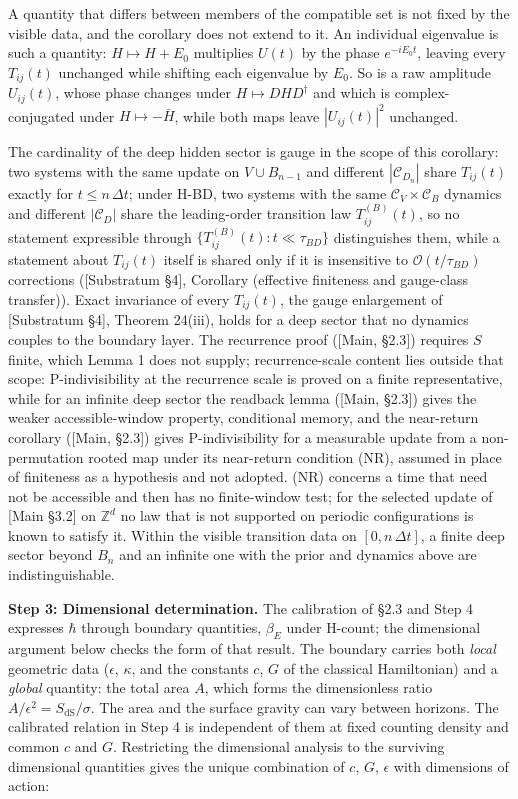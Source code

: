 \documentclass[
]{article}
\begin{document}
A quantity that differs between members of the compatible set is not
fixed by the visible data, and the corollary does not extend to it. An
individual eigenvalue is such a quantity: \(H \mapsto H + E_0\)
multiplies \(U(t)\) by the phase \(e^{-iE_0 t}\), leaving every
\(T_{ij}(t)\) unchanged while shifting each eigenvalue by \(E_0\). So is
a raw amplitude \(U_{ij}(t)\), whose phase changes under
\(H \mapsto DHD^\dagger\) and which is complex-conjugated under
\(H \mapsto -\bar{H}\), while both maps leave \(|U_{ij}(t)|^2\)
unchanged.

The cardinality of the deep hidden sector is gauge in the scope of this
corollary: two systems with the same update on \(V \cup B_{n-1}\) and
different \(|\mathcal{C}_{D_n}|\) share \(T_{ij}(t)\) exactly for
\(t \leq n\,\Delta t\); under H-BD, two systems with the same
\(\mathcal{C}_V \times \mathcal{C}_B\) dynamics and different
\(|\mathcal{C}_D|\) share the leading-order transition law
\(T^{(B)}_{ij}(t)\), so no statement expressible through
\(\{T^{(B)}_{ij}(t) : t \ll \tau_{BD}\}\) distinguishes them, while a
statement about \(T_{ij}(t)\) itself is shared only if it is insensitive
to \(\mathcal{O}(t/\tau_{BD})\) corrections ({[}Substratum §4{]},
Corollary (effective finiteness and gauge-class transfer)). Exact
invariance of every \(T_{ij}(t)\), the gauge enlargement of
{[}Substratum §4{]}, Theorem 24(iii), holds for a deep sector that no
dynamics couples to the boundary layer. The recurrence proof ({[}Main,
§2.3{]}) requires \(S\) finite, which Lemma 1 does not supply;
recurrence-scale content lies outside that scope: P-indivisibility at
the recurrence scale is proved on a finite representative, while for an
infinite deep sector the readback lemma ({[}Main, §2.3{]}) gives the
weaker accessible-window property, conditional memory, and the
near-return corollary ({[}Main, §2.3{]}) gives P-indivisibility for a
measurable update from a non-permutation rooted map under its
near-return condition (NR), assumed in place of finiteness as a
hypothesis and not adopted. (NR) concerns a time that need not be
accessible and then has no finite-window test; for the selected update
of {[}Main §3.2{]} on \(\mathbb{Z}^d\) no law that is not supported on
periodic configurations is known to satisfy it. Within the visible
transition data on \([0, n\,\Delta t]\), a finite deep sector beyond
\(B_n\) and an infinite one with the prior and dynamics above are
indistinguishable.

\textbf{Step 3: Dimensional determination.} The calibration of §2.3 and
Step 4 expresses \(\hbar\) through boundary quantities, \(\beta_E\)
under H-count; the dimensional argument below checks the form of that
result. The boundary carries both \emph{local} geometric data
(\(\epsilon\), \(\kappa\), and the constants \(c\), \(G\) of the
classical Hamiltonian) and a \emph{global} quantity: the total area
\(A\), which forms the dimensionless ratio
\(A/\epsilon^2 = S_{\text{dS}}/\sigma\). The area and the surface
gravity can vary between horizons. The calibrated relation in Step 4 is
independent of them at fixed counting density and common \(c\) and
\(G\). Restricting the dimensional analysis to the surviving dimensional
quantities gives the unique combination of \(c\), \(G\), \(\epsilon\)
with dimensions of action:
\end{document}
